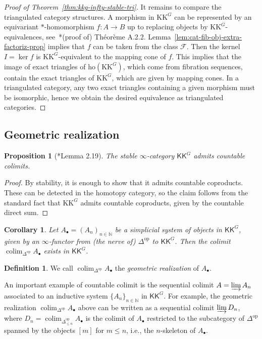\documentclass[a4paper,reqno]{amsart}
\theoremstyle{plain}
\newtheorem{proposition}[theorem]{Proposition}
\newtheorem{corollary}[theorem]{Corollary}
\theoremstyle{definition}
\newtheorem{definition}[theorem]{Definition}
\theoremstyle{remark}
\numberwithin{equation}{section}
\newcommand{\cF}{\mathcal{F}}
\newcommand{\dN}{\mathbb{N}}
\newcommand{\ho}{\mathrm{ho}}
\newcommand{\KK}{\mathrm{KK}}
\newcommand{\icKK}{\mathsf{KK}}
\newcommand{\opo}{\mathrm{op}}
\DeclareMathOperator*{\colim}{colim}
\begin{document}
\begin{proof}[Proof of Theorem~\ref{thm:kkg-infty-stable-tri}]
It remains to compare the triangulated category structures.
A morphism in $\KK^G$ can be represented by an equivariant $*$-homomorphism $f \colon A \to B$ up to replacing objects by $\KK^G$-equivalences, see~\cite{laf:kkban}*{(proof of) Théorème A.2.2}.
Lemma~\ref{lem:cat-fib-obj-extra-factoriz-prop} implies that $f$ can be taken from the class $\cF$.
Then the kernel $I = \ker f$ is $\KK^G$-equivalent to the mapping cone of $f$.
This implies that the image of exact triangles of $\ho(\KK^G)$, which come from fibration sequences, contain the exact triangles of $\KK^G$, which are given by mapping cones.
In a triangulated category, any two exact triangles containing a given morphism must be isomorphic, hence we obtain the desired equivalence as triangulated categories.
\end{proof}

\subsection{Geometric realization}\label{subsec:georeal}

\begin{proposition}[\cite{bel:kkstable}*{Lemma 2.19}]
The stable $\infty$-category $\icKK^G$ admits countable colimits.
\end{proposition}

\begin{proof}
By stability, it is enough to show that it admits countable coproducts.
These can be detected in the homotopy category, so the claim follows from the standard fact that $\KK^G$ admits countable coproducts, given by the countable direct sum.
\end{proof}

\begin{corollary}
Let $A_\bullet = (A_n)_{n \in \dN}$ be a simplicial system of objects in $\icKK^G$, given by an $\infty$-functor from (the nerve of) $\Delta^\opo$ to $\icKK^G$.
Then the colimit $\colim_{\Delta^\opo} A_\bullet$ exists in $\icKK^G$.
\end{corollary}

\begin{definition}
We call $\colim_{\Delta^\opo} A_\bullet$ the \emph{geometric realization} of $A_\bullet$.
\end{definition}

An important example of countable colimit is the sequential colimit $A = \varinjlim A_n$ associated to an inductive system $\{A_n\}_{n\in\dN}$ in $\icKK^G$.
For example, the geometric realization $\colim_{\Delta^\opo} A_\bullet$  above can be written as a sequential colimit $\varinjlim D_n$, where $D_n = \colim_{\Delta^\opo_{\le n}} A_\bullet$ is the colimit of $A_\bullet$ restricted to the subcategory of $\Delta^\opo$ spanned by the objects $[m] $ for $m \le n$, i.e., the $n$-skeleton of $A_\bullet$.
\end{document}
